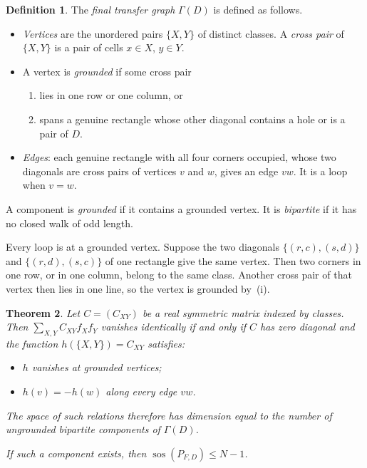\documentclass[11pt,a4paper]{article}
\newtheorem{theorem}{Theorem}[section]
\theoremstyle{definition}
\newtheorem{definition}[theorem]{Definition}
\newcommand{\sos}{\operatorname{sos}}
\begin{document}
\begin{definition}\label{def:final-graph}
The \emph{final transfer graph} $\Gamma(D)$ is defined as follows.
\begin{itemize}
\item \emph{Vertices} are the unordered pairs $\{X,Y\}$ of distinct
      classes. A \emph{cross pair} of $\{X,Y\}$ is a pair of cells
      $x\in X$, $y\in Y$.
\item A vertex is \emph{grounded} if some cross pair
      \begin{enumerate}[label=(\roman*)]
      \item lies in one row or one column, or
      \item spans a genuine rectangle whose other diagonal contains a
            hole or is a pair of $D$.
      \end{enumerate}
\item \emph{Edges}: each genuine rectangle with all four corners occupied,
      whose two diagonals are cross pairs of vertices $v$ and $w$, gives an
      edge $vw$. It is a loop when $v=w$.
\end{itemize}
A component is \emph{grounded} if it contains a grounded vertex. It is
\emph{bipartite} if it has no closed walk of odd length.
\end{definition}

Every loop is at a grounded vertex. Suppose the two diagonals
$\{(r,c),(s,d)\}$ and $\{(r,d),(s,c)\}$ of one rectangle give the same
vertex. Then two corners in one row, or in one column, belong to the same
class. Another cross pair of that vertex then lies in one line, so the
vertex is grounded by~(i).

\begin{theorem}\label{thm:final-graph-relations}
Let $C=(C_{XY})$ be a real symmetric matrix indexed by classes. Then
$\sum_{X,Y}C_{XY}f_Xf_Y$ vanishes identically if and only if $C$ has zero
diagonal and the function $h(\{X,Y\})=C_{XY}$ satisfies:
\begin{itemize}
\item $h$ vanishes at grounded vertices;
\item $h(v)=-h(w)$ along every edge $vw$.
\end{itemize}
The space of such relations therefore has dimension equal to the number of
ungrounded bipartite components of $\Gamma(D)$.

If such a component exists, then $\sos(P_{F,D})\le N-1$.
\end{theorem}
\end{document}
